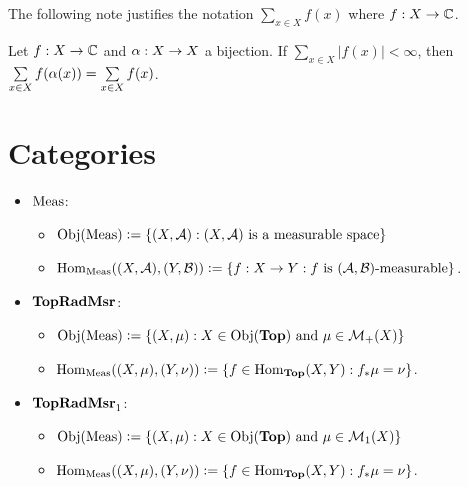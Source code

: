 \documentclass{book}
\begin{document}
	The following note justifies the notation $\sum\limits_{x \in X}f(x)$ where $f:X \rightarrow \mathbb{C}$.
	
	\begin{note}
		Let $f:X \rightarrow \mathbb{C}$ and $\alpha:X \rightarrow X$ a bijection. If $\sum\limits_{x \in X}|f(x)|< \infty$, then $\sum\limits_{x \in X}f( \alpha (x)) = \sum\limits_{x \in X}f(x) $.
	\end{note}















	\chapter{Categories}
	
	\begin{defn}
		\begin{itemize}\
			\item $\operatorname{\text{Meas}}$:
			\begin{itemize}
				\item $\operatorname{Obj}(\operatorname{\text{Meas}}) \vcentcolon= \{(X, \mathcal{A}): (X, \mathcal{A}) \text{ is a measurable space} \}$
				\item $\operatorname{Hom}_{\operatorname{\text{Meas}}}((X, \mathcal{A}), (Y, \mathcal{B})) \vcentcolon= \{f:X \rightarrow Y: f \text{ is $(\mathcal{A}, \mathcal{B})$-measurable}\}$.
			\end{itemize}
			\item $\operatorname{\text{\textbf{TopRadMsr}}}$: 
			\begin{itemize}
				\item $\operatorname{Obj}(\operatorname{\text{Meas}}) \vcentcolon= \{(X, \mu): X \in \operatorname{Obj}(\operatorname*{\text{\textbf{Top}}}) \text{ and } \mu \in \mathcal{M}_+(X) \}$
				\item $\operatorname{Hom}_{\operatorname{\text{Meas}}}((X, \mu), (Y, \nu)) \vcentcolon= \{f \in \operatorname{Hom}_{\operatorname*{\text{\textbf{Top}}}}(X, Y): f_*\mu = \nu\}$.
			\end{itemize}
			\item $\operatorname{\text{\textbf{TopRadMsr}}_1}$: 
			\begin{itemize}
				\item $\operatorname{Obj}(\operatorname{\text{Meas}}) \vcentcolon= \{(X, \mu): X \in \operatorname{Obj}(\operatorname*{\text{\textbf{Top}}}) \text{ and } \mu \in \mathcal{M}_1(X) \}$
				\item $\operatorname{Hom}_{\operatorname{\text{Meas}}}((X, \mu), (Y, \nu)) \vcentcolon= \{f \in \operatorname{Hom}_{\operatorname*{\text{\textbf{Top}}}}(X, Y): f_*\mu = \nu\}$.
			\end{itemize}
		\end{itemize}
	\end{defn}
	
	
	
	
	
	
	

	



	
\end{document}
